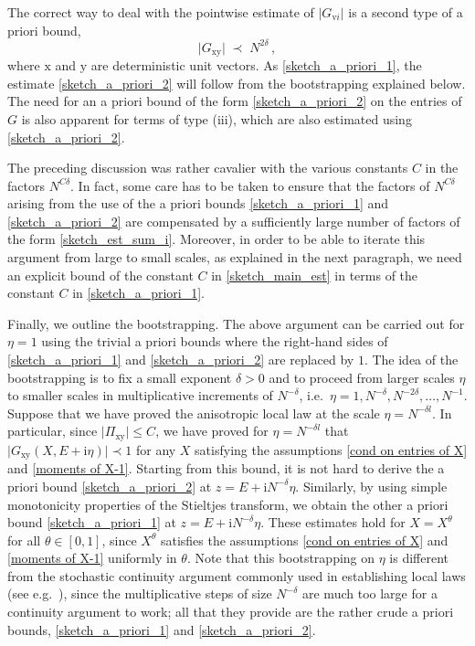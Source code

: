 \documentclass[11pt]{article} %
\numberwithin{equation}{section}
\numberwithin{figure}{section}
\theoremstyle{plain} %
\theoremstyle{definition} %
\newcommand{\f}[1]{\boldsymbol{\mathrm{#1}}} %
\newcommand{\ii}{\mathrm{i}}
\renewcommand{\leq}{\leqslant}
\newcommand{\abs}[1]{\lvert #1 \rvert}
\begin{document}
The correct way to deal with the pointwise estimate of $\abs{G_{\f v i}}$ is a second type of a priori bound,
\begin{equation} \label{sketch_a_priori_2}
\abs{G_{\f x \f y}} \;\prec\; N^{2 \delta}\,,
\end{equation}
where $\f x$ and $\f y$ are deterministic unit vectors. As \eqref{sketch_a_priori_1}, the estimate \eqref{sketch_a_priori_2} will follow from the bootstrapping explained below. The need for an a priori bound of the form \eqref{sketch_a_priori_2} on the entries of $G$ is also apparent for terms of type (iii), which are also estimated using \eqref{sketch_a_priori_2}.

The preceding discussion was rather cavalier with the various constants $C$ in the factors $N^{C \delta}$. In fact, some care has to be taken to ensure that the factors of $N^{C \delta}$ arising from the use of the a priori bounds \eqref{sketch_a_priori_1} and \eqref{sketch_a_priori_2} are compensated by a sufficiently large number of factors of the form \eqref{sketch_est_sum_i}. Moreover, in order to be able to iterate this argument from large to small scales, as explained in the next paragraph, we need an explicit bound of the constant $C$ in \eqref{sketch_main_est} in terms of the constant $C$ in \eqref{sketch_a_priori_1}.

Finally, we outline the bootstrapping. The above argument can be carried out for $\eta = 1$ using the trivial a priori bounds where the right-hand sides of \eqref{sketch_a_priori_1} and \eqref{sketch_a_priori_2} are replaced by $1$. The idea of the bootstrapping is to fix a small exponent $\delta > 0$ and to proceed from larger scales $\eta$ to smaller scales in multiplicative increments of $N^{-\delta}$, i.e.\ $\eta = 1, N^{-\delta}, N^{-2 \delta}, \dots, N^{-1}$. Suppose that we have proved the anisotropic local law at the scale $\eta = N^{-\delta l}$. In particular, since $\abs{\Pi_{\f x \f y}} \leq C$, we have proved for $\eta = N^{-\delta l}$ that $\abs{G_{\f x \f y}(X, E + \ii \eta)} \prec 1$ for any $X$ satisfying the assumptions \eqref{cond on entries of X} and \eqref{moments of X-1}. Starting from this bound, it is not hard to derive the a priori bound \eqref{sketch_a_priori_2} at $z = E + \ii N^{-\delta} \eta$. Similarly, by using simple monotonicity properties of the Stieltjes transform, we obtain the other a priori bound \eqref{sketch_a_priori_1} at $z = E + \ii N^{-\delta} \eta$. These estimates hold for $X = X^\theta$ for all $\theta \in [0,1]$, since $X^\theta$ satisfies the assumptions \eqref{cond on entries of X} and \eqref{moments of X-1} uniformly in $\theta$. Note that this bootstrapping on $\eta$ is different from the stochastic continuity argument commonly used in establishing local laws (see e.g.\ \cite[Section 4.1]{BEKYY}), since the multiplicative steps of size $N^{-\delta}$ are much too large for a continuity argument to work; all that they provide are the rather crude a priori bounds, \eqref{sketch_a_priori_1} and \eqref{sketch_a_priori_2}.
\end{document}
